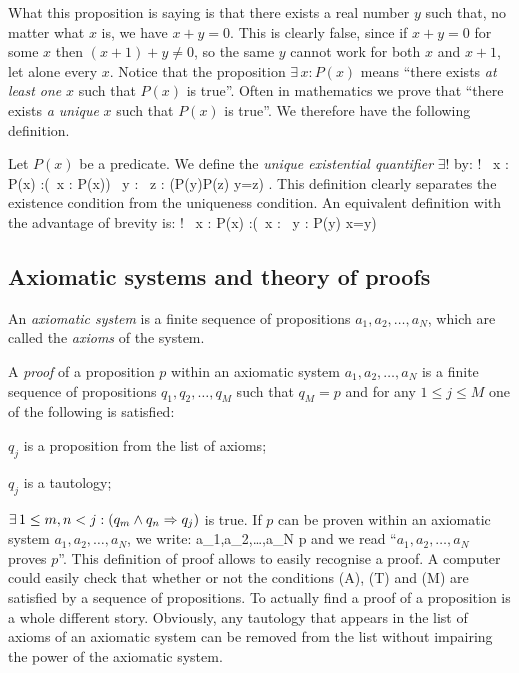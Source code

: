 What this proposition is saying is that there exists a real number $y$ such
that, no matter what $x$ is, we have $x+y=0$. This is clearly false, since if
$x+y=0$ for some $x$ then $(x+1)+y\neq 0$, so the same $y$ cannot work for
both $x$ and $x+1$, let alone every $x$.
\ee
Notice that the proposition $\exists \, x : P(x)$ means ``there exists
\emph{at least one} $x$ such that $P(x)$ is true''. Often in mathematics we
prove that ``there exists \emph{a unique} $x$ such that $P(x)$ is true''. We
therefore have the following definition.

\bd
Let $P(x)$ be a predicate. We define the \emph{unique existential quantifier}
$\exists !$ by:
\bse
\exists ! \, x : P(x) :\eqv (\exists \, x : P(x)) \land \forall \, y : \forall
\, z : (P(y)\land P(z) \imp y=z) .
\ese
\ed
This definition clearly separates the existence condition from the uniqueness
condition. An equivalent definition with the advantage of brevity is:
\bse
\exists ! \, x : P(x) :\eqv (\exists \, x : \forall \, y : P(y) \eqv x=y)
\ese

\subsection{Axiomatic systems and theory of proofs}

\bd
An \emph{axiomatic system} is a finite sequence of propositions
$a_1,a_2,\ldots,a_N$, which are called the \emph{axioms} of the
system.
\ed

\bd
A \emph{proof} of a proposition $p$ within an axiomatic system
$a_1,a_2,\ldots,a_N$ is a finite sequence of propositions $q_1,q_2,\ldots,q_M$
such that $q_M=p$ and for any $1\leq j \leq M$ one of the following is
satisfied:
\ben
\item[(A)] $q_j$ is a proposition from the list of axioms;
\item[(T)] $q_j$ is a tautology;
\item[(M)] $\exists \, 1\leq m,n <j : (q_m\land q_n \Rightarrow q_j)$ is true.
\een
\ed
\br
If $p$ can be proven within an axiomatic system $a_1,a_2,\ldots,a_N$, we
write:
\bse
a_1,a_2,\ldots,a_N \vdash p
\ese
and we read ``$a_1,a_2,\ldots,a_N$ proves $p$''.
\er
\br
This definition of proof allows to easily recognise a proof. A computer could
easily check that whether or not the conditions (A), (T) and (M) are satisfied
by a sequence of propositions. To actually find a proof of a proposition is a
whole different story.
\er
\br
Obviously, any tautology that appears in the list of axioms of an axiomatic
system can be removed from the list without impairing the power of the
axiomatic system.  
\er


